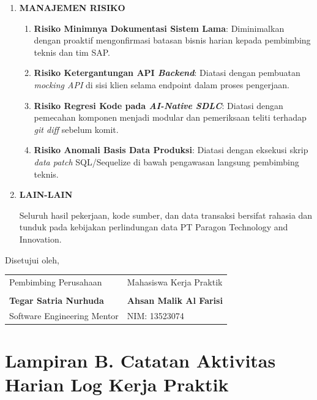 \begin{framed}
\begin{enumerate}[label=\arabic*.,leftmargin=0.8cm,itemsep=8pt,topsep=4pt,parsep=0pt,partopsep=0pt]
\item \textbf{MANAJEMEN RISIKO}
  \begin{enumerate}[label=\alph*),topsep=2pt,itemsep=2pt,parsep=0pt,partopsep=0pt,leftmargin=0.5cm]
    \item \textbf{Risiko Minimnya Dokumentasi Sistem Lama}: Diminimalkan dengan proaktif mengonfirmasi batasan bisnis harian kepada pembimbing teknis dan tim SAP.
    \item \textbf{Risiko Ketergantungan API \textit{Backend}}: Diatasi dengan pembuatan \textit{mocking API} di sisi klien selama endpoint dalam proses pengerjaan.
    \item \textbf{Risiko Regresi Kode pada \textit{AI-Native SDLC}}: Diatasi dengan pemecahan komponen menjadi modular dan pemeriksaan teliti terhadap \textit{git diff} sebelum komit.
    \item \textbf{Risiko Anomali Basis Data Produksi}: Diatasi dengan eksekusi skrip \textit{data patch} SQL/Sequelize di bawah pengawasan langsung pembimbing teknis.
  \end{enumerate}

\item \textbf{LAIN-LAIN}\par\vspace{2pt}
  Seluruh hasil pekerjaan, kode sumber, dan data transaksi bersifat rahasia dan tunduk pada kebijakan perlindungan data PT Paragon Technology and Innovation.
\end{enumerate}

\vspace{0.6cm}
\begin{center}
Disetujui oleh,

\vspace{0.8cm}
\begin{tabular}{p{6cm}p{6cm}}
\centering Pembimbing Perusahaan & \centering Mahasiswa Kerja Praktik \tabularnewline
\vspace{1.2cm} & \vspace{1.2cm} \tabularnewline
\centering \textbf{Tegar Satria Nurhuda} & \centering \textbf{Ahsan Malik Al Farisi} \tabularnewline
\centering Software Engineering Mentor & \centering NIM: 13523074 \tabularnewline
\end{tabular}
\end{center}
\end{framed}

\clearpage
\chapter*{Lampiran B. Catatan Aktivitas Harian Log Kerja Praktik}

